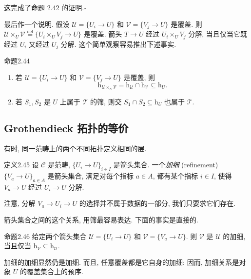 这完成了命题 2.42 的证明.\hfill$\square$

最后作一个说明. 假设 $\mathcal U=\{U_i\to U\}$ 和 $\mathcal V=\{V_j\to U\}$ 是覆盖. 则 $\mathcal U\times_U\mathcal V\overset{\mathrm{def}}=\{U_i\times_UV_j\to U\}$ 是覆盖. 箭头 $T\to U$ 经过 $U_i\times_UV_j$ 分解, 当且仅当它既经过 $U_i$ 又经过 $U_j$ 分解. 这个简单观察容易推出下述事实.

\begin{origstatement}{命题}{2.44}\label{ch02:prop244}
\begin{enumerate}
\item[(1)] 若 $\mathcal U=\{U_i\to U\}$ 和 $\mathcal V=\{V_j\to U\}$ 是覆盖, 则
\[
\mathrm h_{\mathcal U\times_U\mathcal V}=\mathrm h_{\mathcal U}\cap\mathrm h_{\mathcal V}\subseteq\mathrm h_U.
\]
\item[(2)] 若 $S_1,S_2$ 是 $U$ 上属于 $\mathcal T$ 的筛, 则交 $S_1\cap S_2\subseteq\mathrm h_U$ 也属于 $\mathcal T$.
\end{enumerate}
\end{origstatement}

\subsection{Grothendieck 拓扑的等价}\label{ch02:sec235}
有时, 同一范畴上的两个不同拓扑定义相同的层.

\begin{origstatement}{定义}{2.45}\label{ch02:def245}
设 $\mathcal C$ 是范畴, $\{U_i\to U\}_{i\in I}$ 是箭头集合. 一个\emph{加细} (refinement) $\{V_a\to U\}_{a\in A}$ 是箭头集合, 满足对每个指标 $a\in A$, 都有某个指标 $i\in I$, 使得 $V_a\to U$ 经过 $U_i\to U$ 分解.
\end{origstatement}

注意, 分解 $V_a\to U_i\to U$ 的选择并不属于数据的一部分, 我们只要求它们存在.

箭头集合之间的这个关系, 用筛最容易表达. 下面的事实是直接的.

\begin{origstatement}{命题}{2.46}\label{ch02:prop246}
给定两个箭头集合 $\mathcal U=\{U_i\to U\}$ 和 $\mathcal V=\{V_a\to U\}$. 则 $\mathcal V$ 是 $\mathcal U$ 的加细, 当且仅当 $\mathrm h_{\mathcal V}\subseteq\mathrm h_{\mathcal U}$.
\end{origstatement}

加细的加细显然仍是加细. 而且, 任意覆盖都是它自身的加细: 因而, 加细关系是对象 $U$ 的覆盖集合上的预序.

